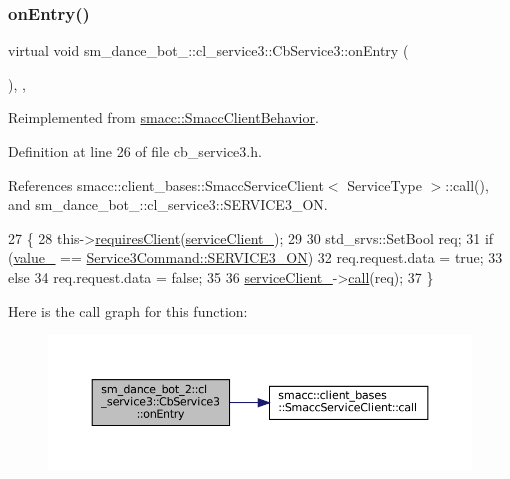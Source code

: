 \subsubsection{\texorpdfstring{on\+Entry()}{onEntry()}}
{\footnotesize\ttfamily virtual void sm\+\_\+dance\+\_\+bot\+\_\+::cl\+\_\+service3\+::\+Cb\+Service3\+::on\+Entry (\begin{DoxyParamCaption}{ }\end{DoxyParamCaption})\hspace{0.3cm}{\ttfamily [inline]}, {\ttfamily [override]}, {\ttfamily [virtual]}}



Reimplemented from \hyperlink{classsmacc_1_1SmaccClientBehavior_a7962382f93987c720ad432fef55b123f}{smacc\+::\+Smacc\+Client\+Behavior}.



Definition at line 26 of file cb\+\_\+service3.\+h.



References smacc\+::client\+\_\+bases\+::\+Smacc\+Service\+Client$<$ Service\+Type $>$\+::call(), and sm\+\_\+dance\+\_\+bot\+\_\+::cl\+\_\+service3\+::\+S\+E\+R\+V\+I\+C\+E3\+\_\+\+ON.


\begin{DoxyCode}
27   \{
28     this->\hyperlink{classsmacc_1_1SmaccClientBehavior_a917f001e763a1059af337bf4e164f542}{requiresClient}(\hyperlink{classsm__dance__bot__2_1_1cl__service3_1_1CbService3_ac5fafa2528bba4c7411816dde044c48a}{serviceClient\_});
29 
30     std\_srvs::SetBool req;
31     \textcolor{keywordflow}{if} (\hyperlink{classsm__dance__bot__2_1_1cl__service3_1_1CbService3_ae48a64bc675b548fcb9c059831e39e37}{value\_} == \hyperlink{namespacesm__dance__bot__2_1_1cl__service3_adfc3ce70a327b24b4fb6d6b02803caffa13cdca48a01bbb44fa8fb35567fbc58e}{Service3Command::SERVICE3\_ON})
32       req.request.data = \textcolor{keyword}{true};
33     \textcolor{keywordflow}{else}
34       req.request.data = \textcolor{keyword}{false};
35 
36     \hyperlink{classsm__dance__bot__2_1_1cl__service3_1_1CbService3_ac5fafa2528bba4c7411816dde044c48a}{serviceClient\_}->\hyperlink{classsmacc_1_1client__bases_1_1SmaccServiceClient_a0e9914f45f1091c38bb9ad6187d07977}{call}(req);
37   \}
\end{DoxyCode}
Here is the call graph for this function\+:
\nopagebreak
\begin{figure}[H]
\begin{center}
\leavevmode
\includegraphics[width=350pt]{classsm__dance__bot__2_1_1cl__service3_1_1CbService3_a179e43cc240f53f9c49c67094e41d75f_cgraph}
\end{center}
\end{figure}


